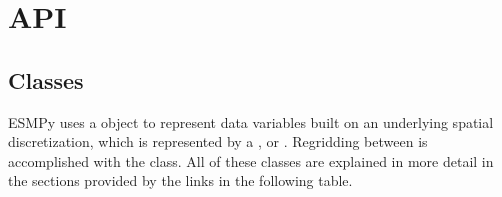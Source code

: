 \documentclass[letterpaper,10pt,english]{sphinxmanual}
\begin{document}
\begin{quote}
\begin{sphinxVerbatim}[commandchars=\\\{\}]
          
          
           

           

         
         


     
\end{sphinxVerbatim}
\end{quote}


\chapter{API}
\label{\detokenize{api:api}}\label{\detokenize{api::doc}}

\section{Classes}
\label{\detokenize{api:classes}}
ESMPy uses a {\hyperref[\detokenize{field:ESMF.api.field.Field}]{}} object to represent data variables
built on an underlying spatial discretization, which is represented by a
{\hyperref[\detokenize{grid:ESMF.api.grid.Grid}]{}}, {\hyperref[\detokenize{mesh:ESMF.api.mesh.Mesh}]{}} or
{\hyperref[\detokenize{locstream:ESMF.api.locstream.LocStream}]{}}.
Regridding between {\hyperref[\detokenize{field:ESMF.api.field.Field}]{}} is accomplished with the
{\hyperref[\detokenize{regrid:ESMF.api.regrid.Regrid}]{}} class.  All of these classes are explained in
more detail in the sections provided by the links in the following table.
\end{document}
